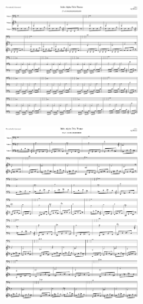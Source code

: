\begin{figure}[H]                                             
{                                                             
  \setlength{\tabcolsep}{3.0pt}                               
  \setlength\cmidrulewidth{\heavyrulewidth} %
    \begin{subfigure}{0.5\textwidth}                            
  \includegraphics[width=6cm]{music/title_no_27_page_1001.png}%
    \end{subfigure}                                             
  \begin{subfigure}{0.5\textwidth}                            
  \includegraphics[width=6cm]{music/title_no_28_page_1001.png}%
    \end{subfigure}                                             
}                                                             
\end{figure}                                                  


